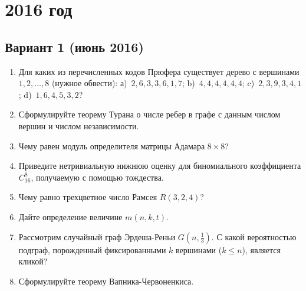 \documentclass[oneside]{book}
\begin{document}
\chapter{2016 год}

\section{Вариант 1 (июнь 2016)}
\begin{enumerate}
\item Для каких из перечисленных кодов Прюфера существует дерево с вершинами $1, 2, \ldots, 8$ (нужное обвести): а)~$2, 6, 3, 3, 6, 1, 7$; b)~$4, 4, 4, 4, 4, 4$; c)~$2, 3, 9, 3, 4, 1$; d)~$1, 6, 4, 5, 3, 2$?
\item Сформулируйте теорему Турана о числе ребер в графе с данным числом вершин и числом независимости.
\item Чему равен модуль определителя матрицы Адамара $8 \times 8$?
\item Приведите нетривиальную нижнюю оценку для биномиального коэффициента $C_{16}^8$, получаемую с помощью тождества.
\item Чему равно трехцветное число Рамсея $R(3, 2, 4)$?
\item Дайте определение величине $m(n, k, t)$.
\item Рассмотрим случайный граф Эрдеша-Реньи $G(n, \frac{1}{3})$. С какой вероятностью подграф, порожденный фиксированными $k$ вершинами ($k \leqslant n$), является кликой?
\item Сформулируйте теорему Вапника-Червоненкиса.
\end{enumerate}
\end{document}
